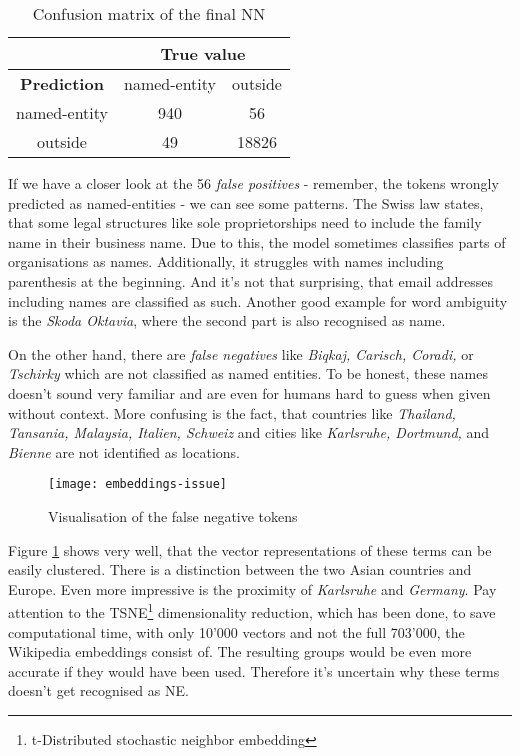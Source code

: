 \begin{table}[ht!]
    \centering
    \begin{tabular}{|c|c|c|}
        \hline
        & \multicolumn{2}{c|}{\textbf{True value}} \\
        \hline
        \textbf{Prediction} & \cellcolor[HTML]{eaeaf2} named-entity & \cellcolor[HTML]{eaeaf2} outside \\
        \hline
        \cellcolor[HTML]{eaeaf2} named-entity & 940 & 56 \\
        \hline
        \cellcolor[HTML]{eaeaf2} outside & 49 & 18826 \\
        \hline
    \end{tabular}
    \caption{Confusion matrix of the final NN}
    \label{tbl:final-errors}
\end{table}

If we have a closer look at the 56 \emph{false positives} - remember, the tokens wrongly predicted as named-entities - we can see some patterns. The Swiss law states, that some legal structures like sole proprietorships need to include the family name in their business name. Due to this, the model sometimes classifies parts of organisations as names. Additionally, it struggles with names including parenthesis at the beginning. And it's not that surprising, that email addresses including names are classified as such. Another good example for word ambiguity is the \emph{Skoda Oktavia}, where the second part is also recognised as name.

On the other hand, there are \emph{false negatives} like \emph{Biqkaj, Carisch, Coradi,} or \emph{Tschirky} which are not classified as named entities. To be honest, these names doesn't sound very familiar and are even for humans hard to guess when given without context. More confusing is the fact, that countries like \emph{Thailand, Tansania, Malaysia, Italien, Schweiz} and cities like \emph{Karlsruhe, Dortmund,} and \emph{Bienne} are not identified as locations.

\begin{figure}[!ht]
    \centering
    \texttt{[image: embeddings-issue]}
    \caption{Visualisation of the false negative tokens}
    \label{fig:embd-issue}
\end{figure}

Figure \ref{fig:embd-issue} shows very well, that the vector representations of these terms can be easily clustered. There is a distinction between the two Asian countries and Europe. Even more impressive is the proximity of \emph{Karlsruhe} and \emph{Germany}. Pay attention to the TSNE\footnote{t-Distributed stochastic neighbor embedding} dimensionality reduction, which has been done, to save computational time, with only 10'000 vectors and not the full 703'000, the Wikipedia embeddings consist of. The resulting groups would be even more accurate if they would have been used. Therefore it's uncertain why these terms doesn't get recognised as NE. 

